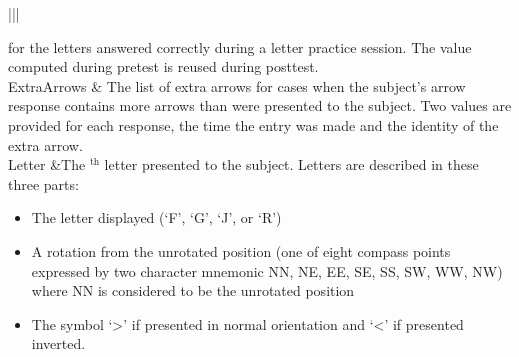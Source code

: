 \documentclass[letterpaper,10pt,english]{sphinxmanual}
\begin{document}
\begin{savenotes}
\begin{longtable}{|*{2}{|}}
\begin{quote}
\end{quote}

for the letters answered correctly during a letter practice session. The value computed during pretest is reused during posttest.
\\
\hline
ExtraArrows
&
The list of extra arrows for cases when the subject’s arrow response contains more arrows than were presented to the subject. Two values are provided for each response, the time the entry was made and the identity of the extra arrow.
\\
\hline
Letter
&The $^{\text{th}}$ letter presented to the subject. Letters are described in these three parts:
\begin{itemize}
\item {} 
The letter displayed (‘F’, ‘G’, ‘J’, or ‘R’)

\item {} 
A rotation from the unrotated position (one of eight compass points expressed by two character mnemonic \textendash{} NN, NE, EE, SE, SS, SW, WW, NW) where NN is considered to be the unrotated position

\item {} 
The symbol ‘\textbar{}\textgreater{}’ if presented in normal orientation and ‘\textless{}\textbar{}’ if presented inverted.

\end{itemize}


\end{longtable}
\end{savenotes}
\end{document}
